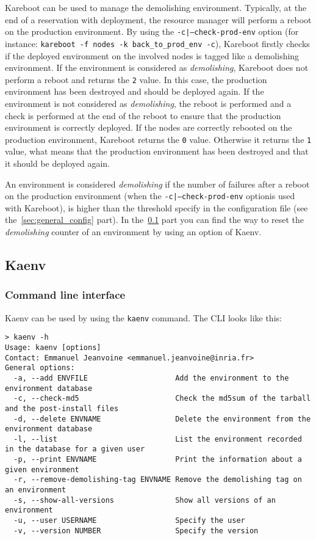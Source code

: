 \documentclass[a4wide,10pt,oneside]{book}
\begin{document}
Kareboot can be used to manage the demolishing environment. Typically, at the end of a reservation with deployment, the resource manager will perform a reboot on the production environment. By using the \texttt{-c|--check-prod-env} option (for instance: \texttt{kareboot -f nodes -k back\_to\_prod\_env -c}), Kareboot firstly checks if the deployed environment on the involved nodes is tagged like a demolishing environment. If the environment is considered as \textit{demolishing}, Kareboot does not perform a reboot and returns the \texttt{2} value. In this case, the production environment has been destroyed and should be deployed again. If the environment is not considered as \textit{demolishing}, the reboot is performed and a check is performed at the end of the reboot to ensure that the production environment is correctly deployed. If the nodes are correctly rebooted on the production environment, Kareboot returns the \texttt{0} value. Otherwise it returns the \texttt{1} value, what means that the production environment has been destroyed and that it should be deployed again.

An environment is considered \textit{demolishing} if the number of failures after a reboot on the production environment (when the \texttt{-c|--check-prod-env} optionis used with Kareboot), is higher than the threshold specify in the configuration file (see the~\ref{sec:general_config} part). In the~\ref{sec:kaenv} part you can find the way to reset the \textit{demolishing} counter of an environment by using an option of Kaenv.


\subsection{Kaenv}\label{sec:kaenv}
\subsubsection{Command line interface}
Kaenv can be used by using the \texttt{kaenv} command. The CLI looks like this:
\begin{small}
\begin{verbatim}
> kaenv -h
Usage: kaenv [options]
Contact: Emmanuel Jeanvoine <emmanuel.jeanvoine@inria.fr>
General options:
  -a, --add ENVFILE                    Add the environment to the environment database
  -c, --check-md5                      Check the md5sum of the tarball and the post-install files
  -d, --delete ENVNAME                 Delete the environment from the environment database
  -l, --list                           List the environment recorded in the database for a given user
  -p, --print ENVNAME                  Print the information about a given environment
  -r, --remove-demolishing-tag ENVNAME Remove the demolishing tag on an environment
  -s, --show-all-versions              Show all versions of an environment
  -u, --user USERNAME                  Specify the user
  -v, --version NUMBER                 Specify the version
\end{verbatim}
\end{small}
\end{document}
